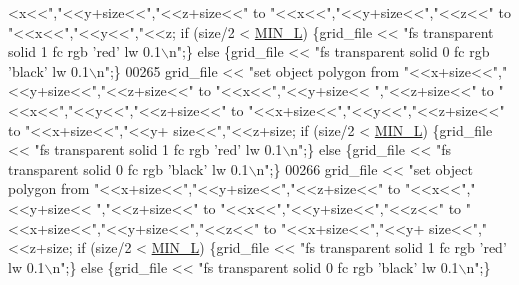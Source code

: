\begin{DoxyCode}
{      <x<<\textcolor{stringliteral}{","}<<y+size<<\textcolor{stringliteral}{","}<<z+size<<\textcolor{stringliteral}{" to "}<<x<<\textcolor{stringliteral}{","}<<y+size<<\textcolor{stringliteral}{","}<<z<<\textcolor{stringliteral}{" to "}<<x<<\textcolor{stringliteral}{","}<<y<<\textcolor{stringliteral}{","}<<z; \textcolor{keywordflow}{if} (size/2 < 
      \hyperlink{Voxel_8cuh_a29d8f4bb35f9fa62e1d680bc6ab1f4f1}{MIN\_L}) \{grid\_file << \textcolor{stringliteral}{"fs transparent solid 1 fc rgb 'red' lw 0.1\(\backslash\)n"};\} \textcolor{keywordflow}{else} \{grid\_file << \textcolor{stringliteral}{"fs
       transparent solid 0 fc rgb 'black' lw 0.1\(\backslash\)n"};\}
00265         grid\_file << \textcolor{stringliteral}{"set object polygon from "}<<x+size<<\textcolor{stringliteral}{","}<<y+size<<\textcolor{stringliteral}{","}<<z+size<<\textcolor{stringliteral}{" to "}<<x<<\textcolor{stringliteral}{","}<<y+size<<\textcolor{stringliteral}{
      ","}<<z+size<<\textcolor{stringliteral}{" to "}<<x<<\textcolor{stringliteral}{","}<<y<<\textcolor{stringliteral}{","}<<z+size<<\textcolor{stringliteral}{" to "}<<x+size<<\textcolor{stringliteral}{","}<<y<<\textcolor{stringliteral}{","}<<z+size<<\textcolor{stringliteral}{" to "}<<x+size<<\textcolor{stringliteral}{","}<<y+
      size<<\textcolor{stringliteral}{","}<<z+size; \textcolor{keywordflow}{if} (size/2 < \hyperlink{Voxel_8cuh_a29d8f4bb35f9fa62e1d680bc6ab1f4f1}{MIN\_L}) \{grid\_file << \textcolor{stringliteral}{"fs transparent solid 1 fc rgb 'red' lw 0.1\(\backslash\)n"};\} \textcolor{keywordflow}{else}
       \{grid\_file << \textcolor{stringliteral}{"fs transparent solid 0 fc rgb 'black' lw 0.1\(\backslash\)n"};\}
00266         grid\_file << \textcolor{stringliteral}{"set object polygon from "}<<x+size<<\textcolor{stringliteral}{","}<<y+size<<\textcolor{stringliteral}{","}<<z+size<<\textcolor{stringliteral}{" to "}<<x<<\textcolor{stringliteral}{","}<<y+size<<\textcolor{stringliteral}{
      ","}<<z+size<<\textcolor{stringliteral}{" to "}<<x<<\textcolor{stringliteral}{","}<<y+size<<\textcolor{stringliteral}{","}<<z<<\textcolor{stringliteral}{" to "}<<x+size<<\textcolor{stringliteral}{","}<<y+size<<\textcolor{stringliteral}{","}<<z<<\textcolor{stringliteral}{" to "}<<x+size<<\textcolor{stringliteral}{","}<<y+
      size<<\textcolor{stringliteral}{","}<<z+size; \textcolor{keywordflow}{if} (size/2 < \hyperlink{Voxel_8cuh_a29d8f4bb35f9fa62e1d680bc6ab1f4f1}{MIN\_L}) \{grid\_file << \textcolor{stringliteral}{"fs transparent solid 1 fc rgb 'red' lw 0.1\(\backslash\)n"};\} \textcolor{keywordflow}{else}
       \{grid\_file << \textcolor{stringliteral}{"fs transparent solid 0 fc rgb 'black' lw 0.1\(\backslash\)n"};\}
}
\end{DoxyCode}
